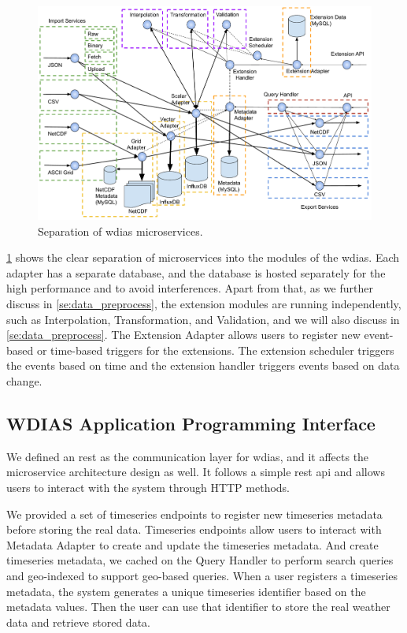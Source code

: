 \begin{figure}[htp]
    \centering
    \includegraphics[width=1\textwidth]{method/microservice/separation_microservices-v4.pdf}
    \caption{Separation of \acrshort{wdias} microservices.}
    \label{fi:wdias_micro_separation}
\end{figure}

\cref{fi:wdias_micro_separation} shows the clear separation of microservices into the modules of the \acrshort{wdias}. Each adapter has a separate database, and the database is hosted separately for the high performance and to avoid interferences.
Apart from that, as we further discuss in \cref{se:data_preprocess}, the extension modules are running independently, such as Interpolation, Transformation, and Validation, and we will also discuss in \cref{se:data_preprocess}. The Extension Adapter allows users to register new event-based or time-based triggers for the extensions. The extension scheduler triggers the events based on time and the extension handler triggers events based on data change.


\subsection{WDIAS Application Programming Interface}
\label{sebse:wdias_api}

We defined an \acrfull{rest} as the communication layer for \acrshort{wdias}, and it affects the microservice architecture design as well. It follows a simple \acrshort{rest} \acrshort{api} and allows users to interact with the system through HTTP methods.

We provided a set of timeseries endpoints to register new timeseries metadata before storing the real data. Timeseries endpoints allow users to interact with Metadata Adapter to create and update the timeseries metadata. And create timeseries metadata, we cached on the Query Handler to perform search queries and geo-indexed to support geo-based queries. When a user registers a timeseries metadata, the system generates a unique timeseries identifier based on the metadata values. Then the user can use that identifier to store the real weather data and retrieve stored data.

